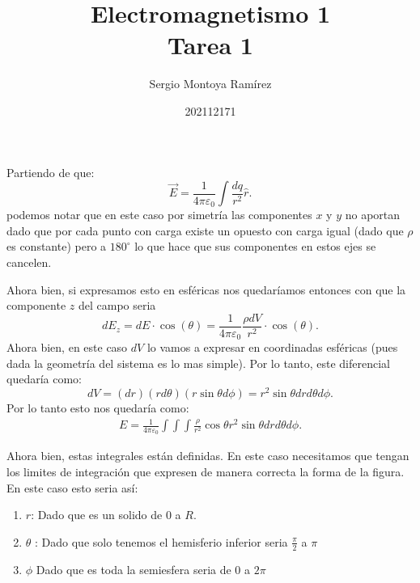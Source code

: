 \documentclass{report}
\title{\Huge{Electromagnetismo 1}\\Tarea 1}
\author{\huge{Sergio Montoya Ramírez}}
\date{202112171}
\begin{document}
\maketitle
\newpage%
\tableofcontents
\pagebreak

\chapter{}
Partiendo de que: \[
  \vec{E} = \frac{1}{4\pi\varepsilon_0} \int \frac{dq}{r^2} \hat{r}
.\] podemos notar que en este caso por simetría las componentes $x$ y $y$ no aportan dado que por cada punto con carga existe un opuesto con carga igual (dado que $\rho$ es constante) pero a $180^{\circ}$ lo que hace que sus componentes en estos ejes se cancelen.

Ahora bien, si expresamos esto en esféricas nos quedaríamos entonces con que la componente $z$ del campo seria \[
d E_z = dE \cdot \cos\left( \theta \right) = \frac{1}{4\pi\varepsilon_0} \frac{\rho dV}{r^2} \cdot \cos\left( \theta \right) 
.\] Ahora bien, en este caso $dV$ lo vamos a expresar en coordinadas esféricas (pues dada la geometría del sistema es lo mas simple). Por lo tanto, este diferencial quedaría como: \[
dV = \left( dr \right) \left( r d\theta \right) \left( r \sin\theta d\phi \right) = r^2\sin\theta dr d\theta d\phi
.\] Por lo tanto esto nos quedaría como:
\begin{align*}
  E = \frac{1}{4\pi\varepsilon_0}\int\int \int \frac{\rho}{r^2}\cos\theta r^2 \sin\theta dr d\theta d\phi
.\end{align*}

Ahora bien, estas integrales están definidas. En este caso necesitamos que tengan los limites de integración que expresen de manera correcta la forma de la figura. En este caso esto seria así:
\begin{enumerate}
  \item $r$: Dado que es un solido de $0$ a $R$.
  \item  $\theta$ :  Dado que solo tenemos el hemisferio inferior seria $\frac{\pi}{2}$ a $\pi$
  \item $\phi$ Dado que es toda la semiesfera seria de $0$ a $2\pi$
\end{enumerate}
\end{document}
